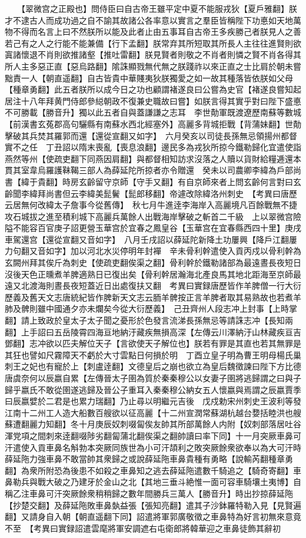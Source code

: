 　　【翠微宫之正殿也】問侍臣曰自古帝王雖平定中夏不能服戎狄【夏戶雅翻】朕才不逮古人而成功過之自不諭其故諸公各率意以實言之羣臣皆稱陛下功悳如天地萬物不得而名言上曰不然朕所以能及此者止由五事耳自古帝王多疾勝己者朕見人之善若己有之人之行能不能兼備【行下孟翻】朕常弃其所短取其所長人主往往進賢則欲寘諸懷退不肖則欲推諸壑【推吐雷翻】朕見賢者則敬之不肖者則憐之賢不肖各得其所人主多惡正直【惡烏路翻】隂誅顯戮無代無之朕踐祚以來正直之士比肩於朝未嘗黜責一人【朝直遥翻】自古皆貴中華賤夷狄朕獨愛之如一故其種落皆依朕如父母【種章勇翻】此五者朕所以成今日之功也顧謂褚遂良曰公嘗為史官【褚遂良嘗知起居注十八年拜黄門侍郎參縂朝政不復兼史職故曰嘗】如朕言得其實乎對曰陛下盛悳不可勝載【勝音升】獨以此五者自與蓋謙謙之志耳　李世勣軍既渡遼歷南蘇等數城【前漢書玄菟郡高句驪縣有南蘇水西北經塞外】高麗多背城拒戰【背蒲妹翻】世勣擊破其兵焚其羅郭而還【還從宣翻又如字】　六月癸亥以司徒長孫無忌領揚州都督實不之任　丁丑詔以隋末喪亂【喪息浪翻】邊民多為戎狄所掠今鐵勒歸化宜遣使詣燕然等州【使疏吏翻下同燕因肩翻】與都督相知訪求沒落之人贖以貨財給糧逓還本貫其室韋烏羅護靺鞨三部人為薛延陀所掠者亦令贈還　癸未以司農卿李緯為戶部尚書【緯于貴翻】時房玄齡留守京師【守手又翻】有自京師來者上問玄齡何言對曰玄齡聞李緯拜尚書但云李緯美髭鬢【髭郎移翻】帝遽改除緯洛州刺史　【考異曰唐歷云居無何改緯太子詹事今從舊傳】　秋七月牛進逹李海岸入高麗境凡百餘戰無不捷攻石城拔之進至積利城下高麗兵萬餘人出戰海岸擊破之斬首二千級　上以翠微宫險隘不能容百官庚子詔更營玉華宫於宜春之鳳皇谷【玉華宫在宜春縣西四十里】庚戌車駕還宫【還從宣翻又音如字】　八月壬戌詔以薛延陀新降土功屢興【降戶江翻屢力句翻又音如字】加以河北水災停明年封襌　辛未骨利幹遣使入貢丙戍以骨利幹為玄闕州拜其俟斤為刺史【使疏吏翻俟渠之翻】骨利幹於鐵勒諸部為最遠晝長夜短日沒後天色正曛煮羊脾適熟日已復出矣【骨利幹居瀚海北產良馬其地北距海至京師最遠又北渡海則晝長夜短蓋近日出處復扶又翻　考異曰實録唐歷皆作羊脾僧一行大衍歷義及舊天文志唐統紀皆作脾新天文志云胹羊髀按正言羊脾者取其易熟故也若煮羊肺及髀則雖中國通夕亦未爛矣今從大衍歷義】　己丑齊州人段志冲上封事【上時掌翻】請上致政於皇太子太子聞之憂形於色發言流涕長孫無忌等請誅志冲【長知兩翻】上手詔曰五岳陵霄四海亘地納汙藏疾無損高深【左傳云川澤納汙山林藏疾亘吉鄧翻】志冲欲以匹夫解位天子【言欲使天子解位也】朕若有罪是其直也若其無罪是其狂也譬如尺霧障天不虧於大寸雲點日何損於明　丁酉立皇子明為曹王明母楊氏巢刺王之妃也有寵於上【刺盧逹翻】文德皇后之崩也欲立為皇后魏徵諫曰陛下方比德唐虞奈何以辰嬴自累【左傳晉太子圉為質於秦秦穆公以女妻子圉將逃歸謂之曰與子歸乎嬴氏不敢從圉遂逃歸及晉公子重耳入秦秦穆公納女五人懷嬴與焉謂之辰嬴賈季曰辰嬴嬖於二君是也累力瑞翻】乃止尋以明繼元吉後　戊戍勅宋州刺史王波利等發江南十二州工人造大船數百艘欲以征高麗【十二州宣潤常蘇湖杭越台㜈括睦洪也艘蘇遭翻麗力知翻】冬十月庚辰奴刺啜匐俟友帥其所部萬餘人内附【奴刺部落居吐谷渾党項之間刺來逹翻啜陟劣翻匐蒲北翻俟渠之翻帥讀曰率下同】十一月突厥車鼻可汗遣使入貢車鼻名斛勃本突厥同族世為小可汗頡利之敗突厥餘衆欲奉以為大可汗時薛延陁力強車鼻不敢當帥其衆歸之或說薛延陁車鼻貴種有勇略【說輸芮翻種章勇翻】為衆所附恐為後患不如殺之車鼻知之逃去薛延陁遣數千騎追之【騎奇寄翻】車鼻勒兵與戰大破之乃建牙於金山之北【其地三垂斗絶惟一面可容車騎壤土夷博】自稱乙注車鼻可汗突厥餘衆稍稍歸之數年間勝兵三萬人【勝音升】時出抄掠薛延陁【抄楚交翻】及薛延陁敗車鼻埶益張【張知亮翻】遣其子沙鉢羅特勒入見【見賢遍翻】又請身自入朝【朝直遥翻下同】詔遣將軍郭廣敬徵之車鼻特為好言初無來意竟不至　【考異曰實録詔遣雲麾將軍安調遮右屯衛郎將韓華迎之車鼻徒飾其辭初